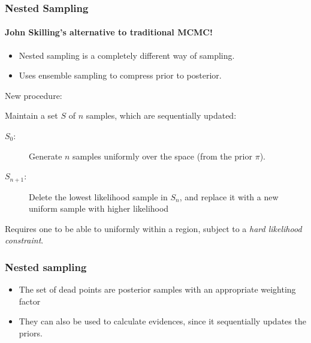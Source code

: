 \documentclass[%
]{beamer}
\newcommand{\prior}{\pi}
\begin{document}
\begin{frame}
  \frametitle{Nested Sampling} 
  \framesubtitle{John Skilling's alternative to traditional MCMC!} 

  \begin{itemize}
    \item Nested sampling is a completely different way of sampling. 
    \item Uses ensemble sampling to compress prior to posterior.
  \end{itemize}
  
  New procedure: 

  
  Maintain a set $S$ of $n$ samples, which are sequentially updated:

  \begin{description}
      
    \item[$S_0$:] Generate $n$ samples uniformly over the space (from the prior $\prior$). 
      
    \item[$S_{n+1}$:] Delete the lowest likelihood sample in $S_{n}$, and replace it with a new uniform sample with higher likelihood
  \end{description}

  
  Requires one to be able to uniformly within a region, subject to a {\em hard likelihood constraint}.

\end{frame}




\begin{frame}
  \frametitle{Nested sampling} 

  \begin{itemize}
    \item The set of dead points are posterior samples with an appropriate weighting factor
    \item They can also be used to calculate evidences, since it sequentially updates the priors.
  \end{itemize}
 
\end{frame}

\end{document}
